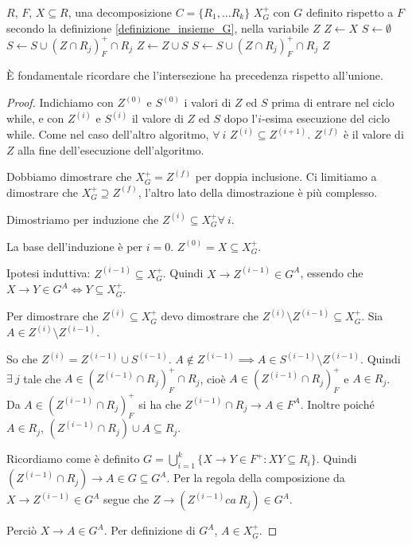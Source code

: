 \begin{algorithm}[ht]
\caption{Calcola la chiusura dell'insieme di attributi $X$ rispetto all'insieme $G$ definito secondo la definizione \ref{definizione_insieme_G}}
\begin{algorithmic}
\Require $R$, $F$, $X \subseteq R$, una decomposizione $C = \{R_1, \dots R_k\}$
\Ensure $X^{+}_{G}$ con $G$ definito rispetto a $F$ secondo la definizione \ref{definizione_insieme_G}, nella variabile $Z$
\State $Z\gets X$
\State $S\gets \emptyset$
    \State $S \gets S \cup (Z \cap R_j)_{F}^{+} \cap R_j$
\EndFor
{}
    \State $Z\gets Z \cup S$
        \State $S \gets S \cup (Z \cap R_j)_{F}^{+} \cap R_j$
    \EndFor
\EndWhile
\State \Return $Z$
\end{algorithmic}
\end{algorithm}
\`E fondamentale ricordare che l'intersezione ha precedenza rispetto all'unione.

\begin{proof}
Indichiamo con $Z^{(0)}$ e $S^{(0)}$ i valori di $Z$ ed $S$ prima di entrare nel ciclo while, e con $Z^{(i)}$ e $S^{(i)}$ il valore di $Z$ ed $S$ dopo l'$i$-esima esecuzione del ciclo while. Come nel caso dell'altro algoritmo, $\forall \ i $ $Z^{(i)} \subseteq Z^{(i+1)}$. $Z^{(f)}$ \`e il valore di $Z$ alla fine dell'esecuzione dell'algoritmo.

Dobbiamo dimostrare che $X^{+}_{G} = Z^{(f)}$ per doppia inclusione. Ci limitiamo a dimostrare che $X^{+}_{G} \supseteq Z^{(f)}$, l'altro lato della dimostrazione \`e pi\`u complesso.

Dimostriamo per induzione che $Z^{(i)} \subseteq X^{+}_{G} \forall \ i$.

La base dell'induzione \`e per $i = 0$. $Z^{(0)} = X \subseteq X^{+}_{G}$.

Ipotesi induttiva: $Z^{(i-1)} \subseteq X^{+}_{G}$. Quindi $X \to Z^{(i-1)} \in G^A$, essendo che $X \to Y \in G^{A} \iff Y \subseteq X^{+}_{G}$.

Per dimostrare che $Z^{(i)} \subseteq X^{+}_{G}$ devo dimostrare che $Z^{(i)} \setminus Z^{(i-1)} \subseteq X^{+}_{G}$. Sia $A \in Z^{(i)} \setminus Z^{(i-1)}$. 

So che $Z^{(i)} = Z^{(i-1)} \cup S^{(i-1)}$. $A \notin Z^{(i-1)} \implies A \in S^{(i-1)} \setminus Z^{(i-1)}$. Quindi $\exists \ j $ tale che $A \in (Z^{(i-1)} \cap R_j)_{F}^{+} \cap R_j$, cio\`e $A \in (Z^{(i-1)} \cap R_j)_{F}^{+}$ e $A \in R_j$. Da $A \in (Z^{(i-1)} \cap R_j)_{F}^{+}$ si ha che $Z^{(i-1)} \cap R_j \to A \in F^A$. Inoltre poich\'e $A \in R_j$, $(Z^{(i - 1)} \cap R_j) \cup A \subseteq R_j$.

Ricordiamo come \`e definito $G = \bigcup_{i = 1}^{k} \{X \to Y \in F^{+} : X Y \subseteq R_i \}$. Quindi $(Z^{(i - 1)} \cap R_j) \to A \in G \subseteq G^A$. Per la regola della composizione da $X \to Z^{(i-1)} \in G^A$ segue che $Z \to (Z^{(i-1)} ca\ R_j) \in G^A$.

Perci\`o $X \to A \in G^A$. Per definizione di $G^A$, $A \in X^{+}_G$.
\end{proof}

